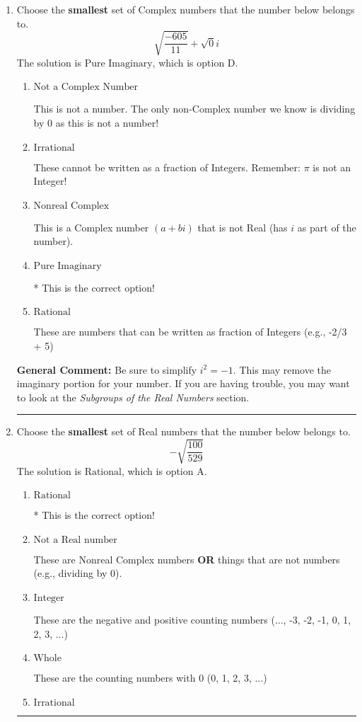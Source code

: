 \documentclass{extbook}[14pt]
\newcommand{\litem}[1]{\item #1

\rule{\textwidth}{0.4pt}}
\begin{document}
\begin{enumerate}\litem{
Choose the \textbf{smallest} set of Complex numbers that the number below belongs to.
\[ \sqrt{\frac{-605}{11}}+\sqrt{0}i \]The solution is \( \text{Pure Imaginary} \), which is option D.\begin{enumerate}[label=\Alph*.]
\item \( \text{Not a Complex Number} \)

This is not a number. The only non-Complex number we know is dividing by 0 as this is not a number!
\item \( \text{Irrational} \)

These cannot be written as a fraction of Integers. Remember: $\pi$ is not an Integer!
\item \( \text{Nonreal Complex} \)

This is a Complex number $(a+bi)$ that is not Real (has $i$ as part of the number).
\item \( \text{Pure Imaginary} \)

* This is the correct option!
\item \( \text{Rational} \)

These are numbers that can be written as fraction of Integers (e.g., -2/3 + 5)
\end{enumerate}

\textbf{General Comment:} Be sure to simplify $i^2 = -1$. This may remove the imaginary portion for your number. If you are having trouble, you may want to look at the \textit{Subgroups of the Real Numbers} section.
}
\litem{
Choose the \textbf{smallest} set of Real numbers that the number below belongs to.
\[ -\sqrt{\frac{100}{529}} \]The solution is \( \text{Rational} \), which is option A.\begin{enumerate}[label=\Alph*.]
\item \( \text{Rational} \)

* This is the correct option!
\item \( \text{Not a Real number} \)

These are Nonreal Complex numbers \textbf{OR} things that are not numbers (e.g., dividing by 0).
\item \( \text{Integer} \)

These are the negative and positive counting numbers (..., -3, -2, -1, 0, 1, 2, 3, ...)
\item \( \text{Whole} \)

These are the counting numbers with 0 (0, 1, 2, 3, ...)
\item \( \text{Irrational} \)


\end{enumerate}}
\end{enumerate}
\end{document}
